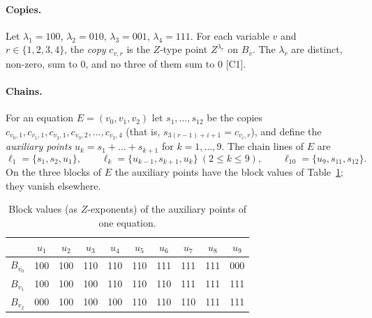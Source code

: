 \documentclass[a4paper,onecolumn,11pt,unpublished,nopdfoutputerror]{quantumarticle}
\theoremstyle{definition}
\newcommand{\cert}[1]{\textcolor{certblue}{\textsf{[#1]}}}
\begin{document}
\paragraph{Copies.} Let $\lambda_1=100$, $\lambda_2=010$, $\lambda_3=001$, $\lambda_4=111$. For each variable $v$ and
$r\in\{1,2,3,4\}$, the \emph{copy} $c_{v,r}$ is the $Z$-type point $Z^{\lambda_r}$ on $B_v$. The $\lambda_r$ are
distinct, non-zero, sum to $0$, and no three of them sum to $0$ \cert{C1}.

\paragraph{Chains.} For an equation $E=(v_0,v_1,v_2)$ let $s_1,\dots,s_{12}$ be the copies
$c_{v_0,1},c_{v_1,1},c_{v_2,1},c_{v_0,2},\dots,c_{v_2,4}$ (that is, $s_{3(r-1)+i+1}=c_{v_i,r}$), and define the
\emph{auxiliary points} $u_k=s_1+\dots+s_{k+1}$ for $k=1,\dots,9$. The chain lines of $E$ are
\[
\ell_1=\{s_1,s_2,u_1\},\qquad \ell_k=\{u_{k-1},s_{k+1},u_k\}\ (2\le k\le 9),\qquad \ell_{10}=\{u_9,s_{11},s_{12}\}.
\]
On the three blocks of $E$ the auxiliary points have the block values of Table~\ref{tab:aux}; they vanish elsewhere.

\begin{table}[h]
\centering\small
\begin{tabular}{c|ccccccccc}
\toprule
 & $u_1$ & $u_2$ & $u_3$ & $u_4$ & $u_5$ & $u_6$ & $u_7$ & $u_8$ & $u_9$\\\midrule
$B_{v_0}$ & 100&100&110&110&110&111&111&111&000\\
$B_{v_1}$ & 100&100&100&110&110&110&111&111&111\\
$B_{v_2}$ & 000&100&100&100&110&110&110&111&111\\\bottomrule
\end{tabular}
\caption{Block values (as $Z$-exponents) of the auxiliary points of one equation.}\label{tab:aux}
\end{table}
\end{document}
